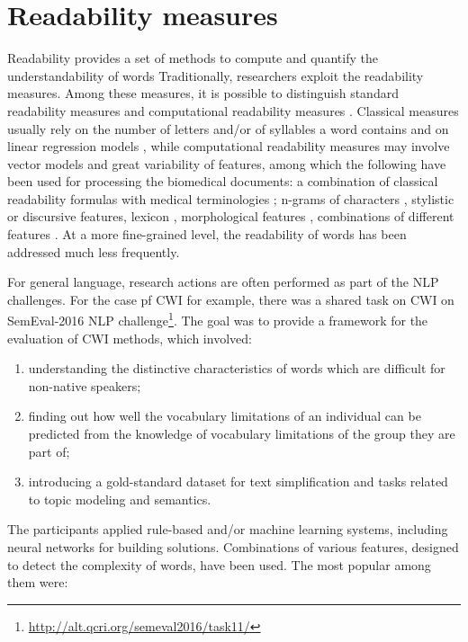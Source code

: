 \section{Readability measures}
Readability provides a set of methods to compute and quantify the understandability of
words
Traditionally, researchers exploit the readability measures. Among these measures, it is possible to distinguish standard readability measures and computational readability measures \citep{Francois-TAL2013}. Classical measures usually rely on the number of letters and/or of syllables a word contains and on linear regression models \citep{Flesch1948,Gunning1973}, while computational readability
measures may involve vector models and great variability of
features, among which the following have been used for processing the
biomedical documents: a combination of classical readability formulas
with medical terminologies \citep{Kokkinakis-2006}; n-grams of
characters \citep{Poprat-MIE2006}, stylistic \citep{Grabar-AMIA2007} or
discursive \citep{Goeuriot-LREC2008} features, lexicon
\citep{Miller-HICSS2007}, morphological features
\citep{Chmielik-TAL2011}, combinations of different features
\citep{Zeng-MEDINFO2007}. At a more fine-grained level, the readability of words has been
addressed much less frequently. 

For general language, research actions are often performed as part of the NLP challenges. For the case pf CWI for example, there was a shared task on CWI on SemEval-2016 NLP challenge\footnote{\url{http://alt.qcri.org/semeval2016/task11/}}. The goal was to provide a framework for the evaluation of CWI methods, which involved:
\begin{enumerate}
    \item understanding the distinctive characteristics of words which are difficult for non-native speakers;
    \item finding out how well the vocabulary limitations of an individual can be predicted from the knowledge of vocabulary limitations of the group they are part of;
    \item introducing a gold-standard dataset for text simplification and tasks related to topic modeling and semantics.
\end{enumerate}

The participants applied rule-based and/or
machine learning systems, including neural networks for building solutions.
Combinations of various features, designed
to detect the complexity of words, have been used. The most popular among them were: 

